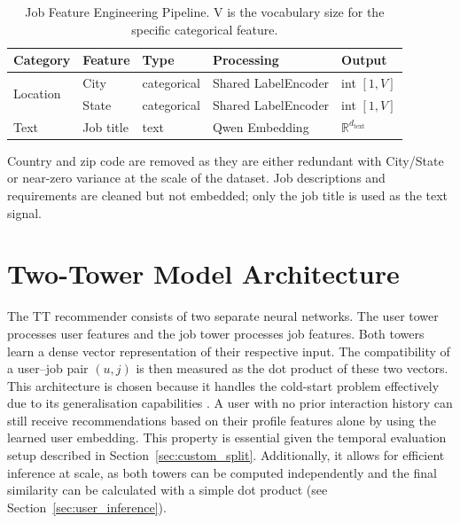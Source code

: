 \begin{table}[H]
    \centering
    \caption{Job Feature Engineering Pipeline. V is the vocabulary size for the specific categorical feature. }
    \label{tab:job_features}
    \begin{tabular}{llllp{3.5cm}}
        \toprule
        \textbf{Category} & \textbf{Feature} & \textbf{Type} & \textbf{Processing} & \textbf{Output} \\
        \midrule
        \multirow{2}{*}{Location}
            & City    & categorical & Shared LabelEncoder & int $[1, V]$ \\
            & State   & categorical & Shared LabelEncoder & int $[1, V]$ \\
        \midrule
        Text & Job title & text & Qwen Embedding & $\mathbb{R}^{d_{\text{text}}}$ \\
        \bottomrule
    \end{tabular}
    \begin{tablenotes}
        \small
        \item Country and zip code are removed as they are either redundant with City/State or near-zero variance at the scale of the dataset. Job descriptions and requirements are cleaned but not embedded; only the job title is used as the text signal.
    \end{tablenotes}
\end{table}

\section{Two-Tower Model Architecture}
\label{sec:user_arch}

The \gls{TT} recommender consists of two separate neural networks. The user tower processes user features and the job tower processes job features. Both towers learn a dense vector representation of their respective input. The compatibility of a user–job pair $(u,j)$ is then measured as the dot product of these two vectors. 
This architecture is chosen because it handles the cold-start problem \cite{rama2019deeplearningaddresscandidate} effectively due to its generalisation capabilities \cite{berisha2023addressingcoldstartrecommendersystemsliteraturesurvey}. A user with no prior interaction history can still receive recommendations based on their profile features alone by using the learned user embedding. This property is essential given the temporal evaluation setup described in Section~\ref{sec:custom_split}. Additionally, it allows for efficient inference at scale, as both towers can be computed independently and the final similarity can be calculated with a simple dot product (see Section~\ref{sec:user_inference}).  


